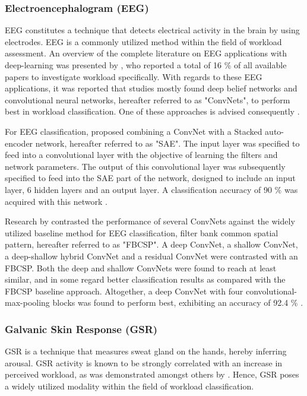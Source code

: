 \documentclass[12pt]{article}
\begin{document}
\subsubsection{Electroencephalogram (EEG)}
EEG constitutes a technique that detects electrical activity in the brain by using electrodes. EEG is a commonly utilized method within the field of workload assessment. An overview of the complete literature on EEG applications with deep-learning was presented by , who reported a total of 16 \% of all available papers to investigate workload specifically. With regards to these EEG applications, it was reported that studies mostly found deep belief networks and convolutional neural networks, hereafter referred to as "ConvNets", to perform best in workload classification. One of these approaches is advised consequently \cite{craik2019deep}.

For EEG classification,  proposed combining a ConvNet with a Stacked auto-encoder network, hereafter referred to as "SAE". The input layer was specified to feed into a convolutional layer with the objective of learning the filters and network parameters. The output of this convolutional layer was subsequently specified to feed into the SAE part of the network, designed to include an input layer, 6 hidden layers and an output layer. A classification accuracy of 90 \% was acquired with this network \cite{tabar2016novel}. 

Research by  contrasted the performance of several ConvNets against the widely utilized baseline method for EEG classification, filter bank common spatial pattern, hereafter referred to as "FBCSP". A deep ConvNet, a shallow ConvNet, a deep-shallow hybrid ConvNet and a residual ConvNet were contrasted with an FBCSP. Both the deep and shallow ConvNets were found to reach at least similar, and in some regard better classification results as compared with the FBCSP baseline approach. Altogether, a deep ConvNet with four convolutional-max-pooling blocks was found to perform best, exhibiting an accuracy of 92.4 \% \cite{schirrmeister2017deep}.

\subsubsection{Galvanic Skin Response (GSR)}
GSR is a technique that measures sweat gland on the hands, hereby inferring arousal. GSR activity is known to be strongly correlated with an increase in perceived workload, as was demonstrated amongst others by . Hence, GSR poses a widely utilized modality within the field of workload classification. 
\end{document}
